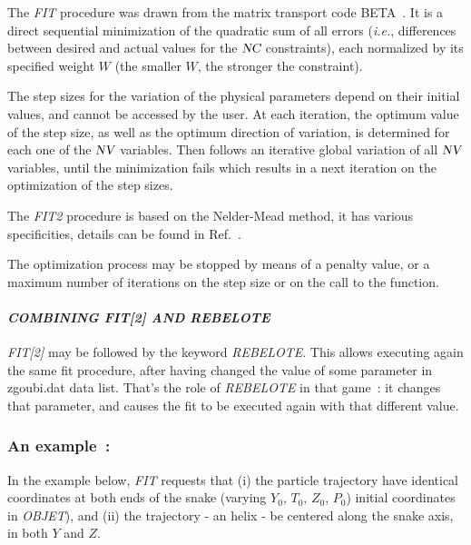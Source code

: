 \noindent The   \textsl{FIT} procedure was drawn from  the matrix transport code BETA~\cite{Biblio10}. 
 It is a direct sequential minimization of the quadratic
sum of all errors (\emph{i.e.}, differences between desired and actual values for the $\textsl{NC}$ 
constraints), each normalized by its specified weight $ W $ (the smaller $ W$,
the stronger the constraint). 

\noindent The step sizes for the variation of the physical parameters depend
on their initial  values, and cannot be accessed by the user. At each iteration, the 
optimum value of the step size, as well as the optimum direction of variation,
is determined for each one of the $\textsl{NV}$ variables. Then follows an iterative
global variation of all $\textsl{NV}$ variables, until the minimization fails which results in a
next iteration on the optimization of the step sizes. 

\medskip

\noindent The \textsl{FIT2} procedure is based on the  Nelder-Mead method, it has various specificities, 
details can be found in Ref.~\cite{NelderMead}.


\medskip

\noindent  The optimization process may be stopped by means of a penalty value, or a maximum number of 
iterations on the step size or on the call to the function. 



\bigskip

\paragraph{\textit{COMBINING FIT[2] AND REBELOTE } }    %


\noindent \textsl{FIT[2]} may be followed by the keyword  \textsl{REBELOTE}.  This allows executing again 
the same fit procedure,  after having changed the value of some parameter in zgoubi.dat data list. 
That's the role of   \textsl{REBELOTE}  in that game~: it changes that parameter, and causes 
the fit to be executed again with that different value. 

\subsubsection*{An example~: \label{ExaFITREBELOTE}}

In the example below, \textsl{FIT} requests that (i) the particle trajectory have identical coordinates at both ends of the snake 
(varying $Y_0$, $T_0$, $Z_0$, $P_0$) initial coordinates in \textsl{OBJET}),   and (ii) the trajectory  - an helix - be centered 
 along the snake axis, in both $Y$ and $Z$. 

